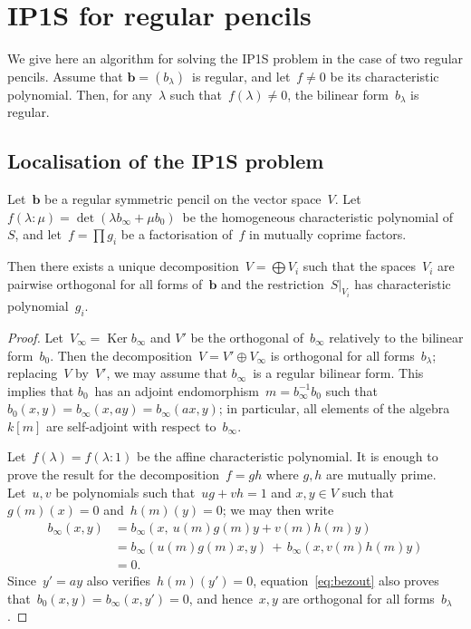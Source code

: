 \documentclass{lms}%
\DeclareMathOperator\Ker{Ker}
\begin{document}
\section{IP1S for regular pencils}%
\label{S:IP1S-regular}

We give here an algorithm for solving the IP1S problem in the case of two
regular pencils. Assume that $\bm{b} = (b_{λ})$~is regular, and let~$f ≠ 0$
be its characteristic polynomial. Then, for any~$λ$ such that~$f(λ) ≠ 0$,
the bilinear form~$b_{λ}$ is regular.

\subsection{Localisation of the IP1S problem}%

\begin{lem}\label{lem:decomp-bezout}%
Let~$\bm{b}$ be a regular symmetric pencil on the vector space~$V$.
Let~$f(λ: μ) = \det (λ b_{∞} + μ b_0)$~be the homogeneous characteristic
polynomial of~$S$, and let~$f = ∏ g_i$ be a factorisation of~$f$ in
mutually coprime factors.

Then there exists a unique decomposition~$V = ⨁ V_i$ such that the
spaces~$V_i$ are pairwise orthogonal for all forms of~$\bm{b}$ and the
restriction~$S|_{V_i}$ has characteristic polynomial~$g_i$.
\end{lem}

\begin{proof}
Let~$V_{∞} = \Ker b_{∞}$ and $V'$ be the orthogonal of~$b_{∞}$ relatively
to the bilinear form~$b_{0}$. Then the decomposition~$V = V' ⊕ V_{∞}$ is
orthogonal for all forms~$b_{λ}$; replacing~$V$ by~$V'$, we may assume
that $b_{∞}$~is a regular bilinear form. This implies that $b_0$~has an
adjoint endomorphism~$m = b_{∞}^{-1} b_0$ such that~$b_0(x,y) = b_{∞}(x,
ay) = b_{∞}(ax, y)$; in particular, all elements of the algebra~$k[m]$
are self-adjoint with respect to~$b_{∞}$.

Let~$f(λ) = f(λ: 1)$ be the affine characteristic polynomial. It is
enough to prove the result for the decomposition~$f = gh$ where $g, h$
are mutually prime. Let~$u, v$ be polynomials such that~$ug + vh = 1$ and
$x, y ∈ V$ such that~$g(m)(x) = 0$ and~$h(m)(y) = 0$; we may then write
\begin{equation}\label{eq:bezout}
\begin{split}
b_{∞} (x, y) & = b_{∞} (x,\: u(m) g(m) y + v(m) h(m) y ) \\
&= b_{∞} (u(m) g(m) x, y) \,+\, b_{∞} (x, v(m) h(m) y) \\
&= 0.
\end{split}
\end{equation}
Since~$y' = ay$ also verifies~$h(m)(y') = 0$, equation~\eqref{eq:bezout}
also proves that~$b_{0}(x,y) = b_{∞}(x,y') = 0$, and hence~$x, y$ are
orthogonal for all forms~$b_{λ}$.
\end{proof}%
\end{document}

